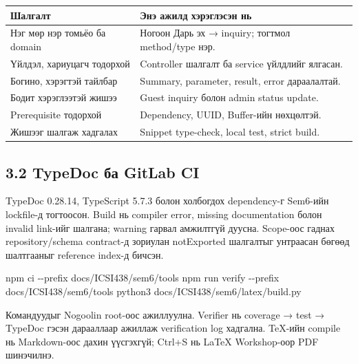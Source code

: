 \documentclass[
  mongolian,
]{article}
\newenvironment{Shaded}{}{}
\newcommand{\NormalTok}[1]{#1}
\begin{document}
\begin{longtable}[]{@{}
  >{\raggedright\arraybackslash}p{}
  >{\raggedright\arraybackslash}p{}@{}}
\toprule\noalign{}
\begin{minipage}[b]{\linewidth}\raggedright
Шалгалт
\end{minipage} & \begin{minipage}[b]{\linewidth}\raggedright
Энэ ажилд хэрэглэсэн нь
\end{minipage} \\
\midrule\noalign{}
\endhead
\bottomrule\noalign{}
\endlastfoot
Нэг мөр нэр томьёо ба domain & Ногоон Дарь эх → inquiry; тогтмол
method/type нэр. \\
Үйлдэл, хариуцагч тодорхой & Controller шалгалт ба service үйлдлийг
ялгасан. \\
Богино, хэрэгтэй тайлбар & Summary, parameter, result, error
дараалалтай. \\
Бодит хэрэглээтэй жишээ & Guest inquiry болон admin status update. \\
Prerequisite тодорхой & Dependency, UUID, Buffer-ийн нөхцөлтэй. \\
Жишээг шалгаж хадгалах & Snippet type-check, local test, strict
build. \\
\end{longtable}

\subsection{3.2 TypeDoc ба GitLab
CI}\label{typedoc-ux431ux430-gitlab-ci}

TypeDoc 0.28.14, TypeScript 5.7.3 болон холбогдох dependency-г Sem6-ийн
lockfile-д тогтоосон. Build нь compiler error, missing documentation
болон invalid link-ийг шалгана; warning гарвал амжилтгүй дуусна.
Scope-оос гаднах repository/schema contract-д зориулан notExported
шалгалтыг унтраасан бөгөөд шалтгааныг reference index-д бичсэн.

\begin{Shaded}
\begin{Highlighting}[]
\NormalTok{npm ci {-}{-}prefix docs/ICSI438/sem6/tools}
\NormalTok{npm run verify {-}{-}prefix docs/ICSI438/sem6/tools}
\NormalTok{python3 docs/ICSI438/sem6/latex/build.py}
\end{Highlighting}
\end{Shaded}

Командуудыг Nogoolin root-оос ажиллуулна. Verifier нь coverage → test →
TypeDoc гэсэн дарааллаар ажиллаж verification log хадгална. TeX-ийн
compile нь Markdown-оос дахин үүсгэхгүй; Ctrl+S нь LaTeX Workshop-оор
PDF шинэчилнэ.
\end{document}
